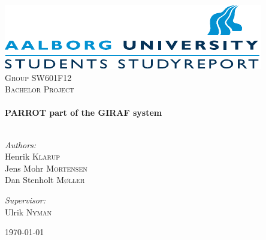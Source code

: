 \begin{nopagebreak}

\begin{center}

\includegraphics[width=\textwidth]{input/Images/aau_logo_en.pdf}\\[1cm]    

\textsc{\LARGE Group SW601F12}\\[1.5cm]

\textsc{\Large Bachelor Project}\\[0.5cm]


\HRule \\[0.4cm]
{ \huge \bfseries PARROT part of the GIRAF system}\\[0.4cm]

\HRule \\[1.5cm]

\begin{minipage}{0.4\textwidth}
\begin{flushleft} \large
\vspace{1.25cm}
\emph{Authors:}\\
Henrik \textsc{Klarup} \\
Jens Mohr \textsc{Mortensen} \\
Dan Stenholt \textsc{M\o{}ller}
\end{flushleft}
\end{minipage}
\begin{minipage}{0.4\textwidth}
\begin{flushright} \large
\emph{Supervisor:} \\
Ulrik \textsc{Nyman}
\end{flushright}
\end{minipage}

\vfill

{\large \today}

\end{center}

\end{nopagebreak}
